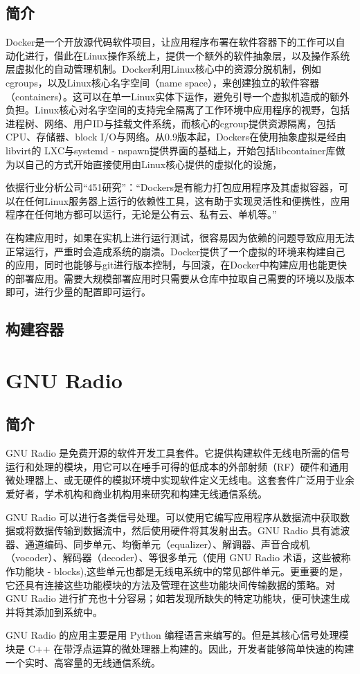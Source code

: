 		\subsection{简介}
			\par Docker是一个开放源代码软件项目，让应用程序布署在软件容器下的工作可以自动化进行，借此在Linux操作系统上，提供一个额外的软件抽象层，以及操作系统层虚拟化的自动管理机制。Docker利用Linux核心中的资源分脱机制，例如cgroups，以及Linux核心名字空间（name space），来创建独立的软件容器（containers）。这可以在单一Linux实体下运作，避免引导一个虚拟机造成的额外负担。Linux核心对名字空间的支持完全隔离了工作环境中应用程序的视野，包括进程树、网络、用户ID与挂载文件系统，而核心的cgroup提供资源隔离，包括CPU、存储器、block I/O与网络。从0.9版本起，Dockers在使用抽象虚拟是经由libvirt的 LXC与systemd - nspawn提供界面的基础上，开始包括libcontainer库做为以自己的方式开始直接使用由Linux核心提供的虚拟化的设施，
			\par 依据行业分析公司“451研究”：“Dockers是有能力打包应用程序及其虚拟容器，可以在任何Linux服务器上运行的依赖性工具，这有助于实现灵活性和便携性，应用程序在任何地方都可以运行，无论是公有云、私有云、单机等。”\cite{ wiki:Docker}
			\par 在构建应用时，如果在实机上进行运行测试，很容易因为依赖的问题导致应用无法正常运行，严重时会造成系统的崩溃。Docker提供了一个虚拟的环境来构建自己的应用，同时也能够与git进行版本控制，与回滚，在Docker中构建应用也能更快的部署应用。需要大规模部署应用时只需要从仓库中拉取自己需要的环境以及版本即可，进行少量的配置即可运行。
		\subsection{构建容器}
	\section{GNU Radio}
	\label{sec:gnuradio}
		\subsection{简介}
			\par GNU Radio 是免费开源的软件开发工具套件。它提供构建软件无线电所需的信号运行和处理的模块，用它可以在唾手可得的低成本的外部射频（RF）硬件和通用微处理器上、或无硬件的模拟环境中实现软件定义无线电。这套套件广泛用于业余爱好者，学术机构和商业机构用来研究和构建无线通信系统。
			\par GNU Radio 可以进行各类信号处理。可以使用它编写应用程序从数据流中获取数据或将数据传输到数据流中，然后使用硬件将其发射出去。GNU Radio 具有滤波器、通道编码、同步单元、均衡单元（equalizer）、解调器、声音合成机（vocoder）、解码器（decoder）、等很多单元（使用 GNU Radio 术语，这些被称作功能块 - blocks),这些单元也都是无线电系统中的常见部件单元。更重要的是，它还具有连接这些功能模块的方法及管理在这些功能块间传输数据的策略。对 GNU Radio 进行扩充也十分容易；如若发现所缺失的特定功能块，便可快速生成并将其添加到系统中。
			\par GNU Radio 的应用主要是用 Python 编程语言来编写的。但是其核心信号处理模块是 C++ 在带浮点运算的微处理器上构建的。因此，开发者能够简单快速的构建一个实时、高容量的无线通信系统。\cite{what_is_gnuradio}
